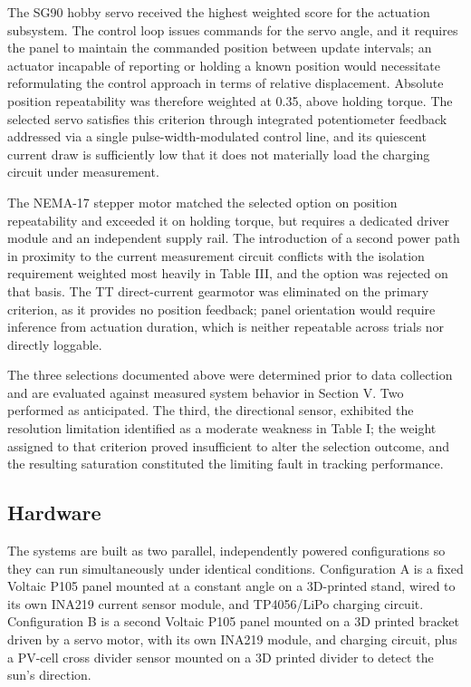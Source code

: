 \documentclass[journal]{IEEEtran}
\begin{document}
The SG90 hobby servo received the highest weighted score for the actuation subsystem.
The control loop issues commands for the servo angle, and it requires the panel to
maintain the commanded position between update intervals; an actuator incapable of
reporting or holding a known position would necessitate reformulating the control
approach in terms of relative displacement. Absolute position repeatability was
therefore weighted at 0.35, above holding torque. The selected servo satisfies this
criterion through integrated potentiometer feedback addressed via a single
pulse-width-modulated control line, and its quiescent current draw is sufficiently low
that it does not materially load the charging circuit under measurement.

The NEMA-17 stepper motor matched the selected option on position repeatability and
exceeded it on holding torque, but requires a dedicated driver module and an
independent supply rail. The introduction of a second power path in proximity to the
current measurement circuit conflicts with the isolation requirement weighted most
heavily in Table III, and the option was rejected on that basis. The TT direct-current
gearmotor was eliminated on the primary criterion, as it provides no position feedback;
panel orientation would require inference from actuation duration, which is neither
repeatable across trials nor directly loggable.

The three selections documented above were determined prior to data collection and are
evaluated against measured system behavior in Section V. Two performed as anticipated.
The third, the directional sensor, exhibited the resolution limitation identified as a
moderate weakness in Table I; the weight assigned to that criterion proved insufficient
to alter the selection outcome, and the resulting saturation constituted the limiting
fault in tracking performance.

\subsection{Hardware}

The systems are built as two parallel, independently powered configurations so they can
run simultaneously under identical conditions. Configuration A is a fixed Voltaic P105
panel mounted at a constant angle on a 3D-printed stand, wired to its own INA219 current
sensor module, and TP4056/LiPo charging circuit. Configuration B is a second Voltaic
P105 panel mounted on a 3D printed bracket driven by a servo motor, with its own INA219
module, and charging circuit, plus a PV-cell cross divider sensor mounted on a 3D
printed divider to detect the sun's direction.
\end{document}
